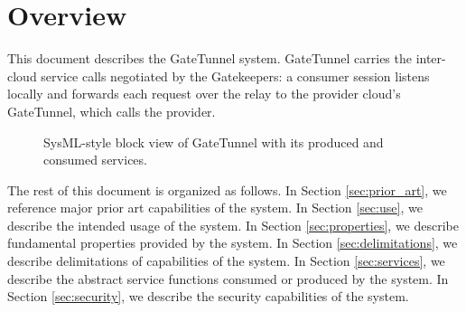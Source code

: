 \documentclass[a4paper]{arrowhead}
\begin{document}
\section{Overview}
\label{sec:overview}

This document describes the GateTunnel system. GateTunnel carries the inter-cloud service calls negotiated by the Gatekeepers: a consumer session listens locally and forwards each request over the relay to the provider cloud's GateTunnel, which calls the provider.

\begin{figure}[ht!]
  \centering
  \caption{SysML-style block view of GateTunnel with its produced and consumed services.}
  \label{fig:system}
\end{figure}

The rest of this document is organized as follows.
In Section \ref{sec:prior_art}, we reference major prior art capabilities of the system.
In Section \ref{sec:use}, we describe the intended usage of the system.
In Section \ref{sec:properties}, we describe fundamental properties provided by the system.
In Section \ref{sec:delimitations}, we describe delimitations of capabilities of the system.
In Section \ref{sec:services}, we describe the abstract service functions consumed or produced by the system.
In Section \ref{sec:security}, we describe the security capabilities of the system.
\end{document}
